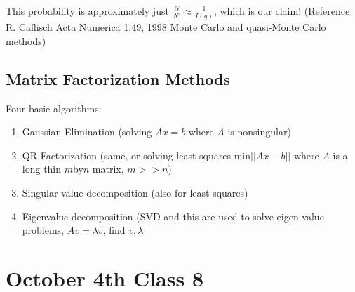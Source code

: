 This probability is approximately just $\frac{N}{N'} \approx
\frac{1}{I(q)}$, which is our claim! (Reference R. Caflisch Acta
Numerica 1:49, 1998 Monte Carlo and quasi-Monte Carlo methods)

\subsection{Matrix Factorization Methods}
\label{sec:matrixfactorization}
Four basic algorithms:
\begin{enumerate}
\item Gaussian Elimination (solving $Ax=b$ where $A$ is nonsingular)
\item QR Factorization (same, or solving least squares min$||Ax-b||$
  where $A$ is a long thin $m$by$n$ matrix, $m>>n$)
\item Singular value decomposition (also for least squares)
\item Eigenvalue decomposition (SVD and this are used to solve eigen
  value problems, $Av= \lambda v$, find $v, \lambda$
\end{enumerate}

\pagebreak
\section{October 4th Class 8}
\label{sec:class8}

